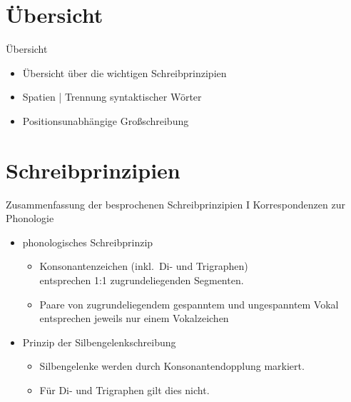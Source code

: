 \section{Übersicht}

\begin{frame}
  {Übersicht}
  \onslide<+->
  \begin{itemize}[<+->]
    \item Übersicht über die wichtigen \alert{Schreibprinzipien}
      \Zeile
    \item \alert{Spatien} | Trennung syntaktischer Wörter
      \Zeile
    \item \alert{Positionsunabhängige Großschreibung}
  \end{itemize}
\end{frame}



\section[Prinzipien]{Schreibprinzipien}

\begin{frame}
  {Zusammenfassung der besprochenen Schreibprinzipien I}
  \pause
  Korrespondenzen zur Phonologie\\
  \Zeile
  \pause
  \begin{itemize}[<+->]
    \item \alert{phonologisches Schreibprinzip}
      \begin{itemize}[<+->]
        \item Konsonantenzeichen (inkl.\ Di- und Trigraphen)\\
          entsprechen 1:1 zugrundeliegenden Segmenten.
        \item Paare von zugrundeliegendem gespanntem und ungespanntem Vokal\\
          entsprechen jeweils nur einem Vokalzeichen 
      \end{itemize}
     \Zeile 
    \item \alert{Prinzip der Silbengelenkschreibung}
      \begin{itemize}[<+->]
        \item Silbengelenke werden durch Konsonantendopplung markiert.
        \item Für Di- und Trigraphen gilt dies nicht.
      \end{itemize}
  \end{itemize}
\end{frame}

